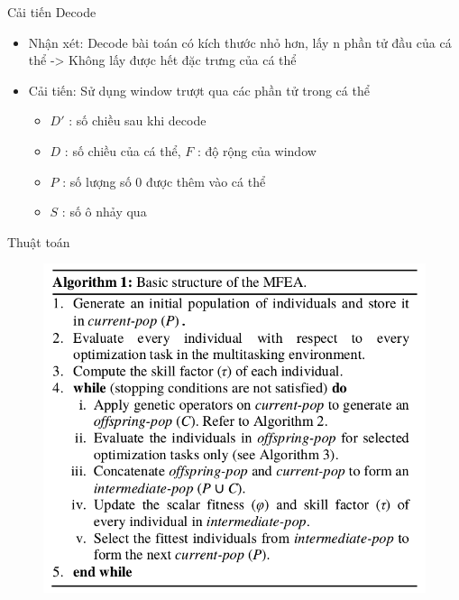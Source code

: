 \documentclass[compress]{beamer}
\begin{document}
\begin{frame}{Cải tiến Decode}
\begin{itemize}
\item Nhận xét: Decode bài toán có kích thước nhỏ hơn, lấy n phần tử đầu của cá thể -> Không lấy được hết đặc trưng của cá thể
\item Cải tiến: Sử dụng window trượt qua các phần tử trong cá thể

\begin{itemize}
\item $D'$ : số chiều sau khi decode
\item $D$ : số chiều của cá thể, $F$ : độ rộng của window
\item $P$ : số lượng số 0 được thêm vào cá thể 
\item $S$ : số ô nhảy qua  
\end{itemize}
\end{itemize}
\end{frame}

\begin{frame}{Thuật toán}
\begin{figure}
\includegraphics[scale=0.45]{al1.png}
\end{figure}
\end{frame}
\end{document}
